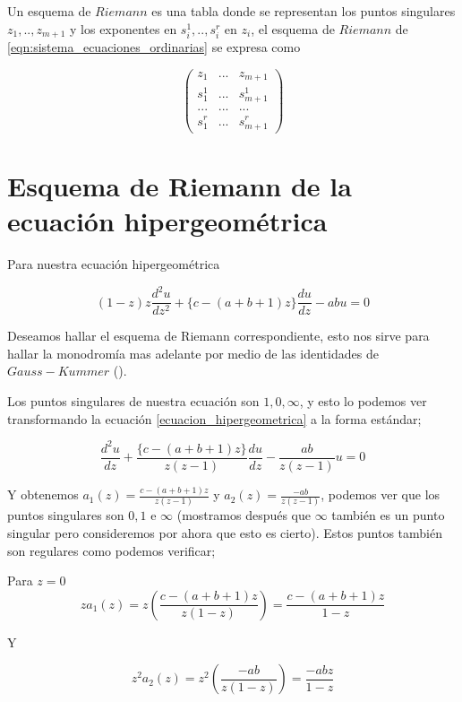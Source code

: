 \begin{defn} Un esquema de $Riemann$ es una tabla donde se representan los puntos singulares $z_{1},..,z_{m+1}$ y los exponentes en $s_{i}^{1},..,s_{i}^{r}$ en $z_{i}$, el esquema de $Riemann$ de \ref{eqn:sistema_ecuaciones_ordinarias} se expresa como



\[ \left( \begin{array}{ccc}
z_{1} & ... & z_{m+1} \\
s_{1}^{1} & ... & s_{m+1}^{1} \\
... & ... & ... \\
s_{1}^{r} & ... & s_{m+1}^{r} \end{array} \right)\]

\end{defn}

\section{Esquema de Riemann de la ecuaci\'on hipergeom\'etrica}

Para nuestra ecuaci\'on hipergeom\'etrica

\begin{equation}
\label{ecuacion_hipergeometrica}
 (1-z )z \frac{d^{2}u}{dz^{2}} + \lbrace  c -(a+b+1)z \rbrace \frac{du}{dz} -abu =0
\end{equation}

Deseamos hallar el esquema de Riemann  correspondiente, esto nos sirve para hallar la monodrom\'ia mas adelante por medio de las identidades de $Gauss-Kummer$ (\cite{gausspainleve}).

Los puntos singulares de nuestra ecuaci\'on son $1,0,\infty$, y esto lo podemos ver transformando la ecuaci\'on \ref{ecuacion_hipergeometrica} a la forma est\'andar;

$$ \frac{d^{2}u}{dz} + \frac{\lbrace c-(a+b+1)z \rbrace}{z(z-1)}\frac{du}{dz} - \frac{ab}{z(z-1)}u=0$$

Y obtenemos $a_{1}(z) = \frac{c- (a+b+1)z}{z(z-1)}$ y $a_{2}(z)=\frac{-ab}{z(z-1)}$, podemos ver que los puntos singulares son $0,1$ e $\infty$ (mostramos despu\'es que $\infty$ tambi\'en es un punto singular pero consideremos por ahora que esto es cierto). Estos puntos tambi\'en son regulares como podemos verificar;

Para $z=0$
$$za_{1}(z) = z (\frac{c-(a+b+1)z}{z(1-z)})= \frac{c-(a+b+1)z}{1-z}$$

Y

$$z^{2}a_{2}(z)=z^{2} (\frac{-ab}{z(1-z)})= \frac{-abz}{1-z}$$

